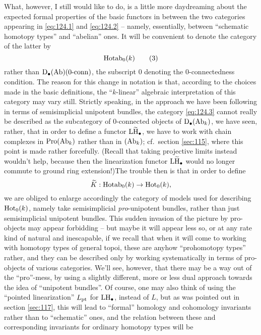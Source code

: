 What, however, I still would like to do, is a little more daydreaming
about the expected formal properties of the basic functors in between
the two categories appearing in \eqref{eq:124.1} and \eqref{eq:124.2}
-- namely, essentially, between ``schematic homotopy types'' and
``abelian'' ones. It will be convenient to denote the
category of the latter by
\begin{equation}
  \label{eq:124.3}
  \operatorname{Hotab}_0(k)\tag{3}
\end{equation}
rather than ${\mathrm{D}}_\bullet{\ensuremath{(\mathrm{Ab})}}(0\textup{-}\mathrm{conn})$, the subscript $0$ denoting the
$0$-connectedness condition. The reason for this change in notation is
that, according to the choices made in the basic definitions, the
``$k$-linear'' algebraic interpretation of this category may vary
still. Strictly speaking, in the approach we have been following in
terms of semisimplicial unipotent bundles, the category
\eqref{eq:124.3} cannot really be described as the subcategory of
$0$-connected objects of ${\mathrm{D}}_\bullet(\operatorname{Ab}_k)$, we have seen, rather,
that in order to define a functor $\operatorname{L\widetilde H}_\bullet$, we have to work with
chain complexes in $\operatorname{Pro}(\operatorname{Ab}_k)$ rather than in $(\operatorname{Ab}_k)$; cf.\
section \ref{sec:115}, where this point is made rather
forcefully. (Recall that taking projective limits instead wouldn't
help, because then the linearization functor $\operatorname{L\widetilde H}_\bullet$ would no
longer commute to ground ring extension!)\enspace The trouble then is
that in order to define
\[\widetilde K:\operatorname{Hotab}_0(k) \to \operatorname{Hot}_0(k),\]
we are obliged to enlarge accordingly the category of models used for
describing $\operatorname{Hot}_0(k)$, namely take semisimplicial
\emph{pro}-unipotent bundles, rather than just semisimplicial
unipotent bundles. This sudden invasion of the picture by pro-objects
may appear forbidding -- but maybe it will appear less so, or at any
rate kind of natural and inescapable, if we recall that when it will
come to working with homotopy types of general topoi, these are anyhow
``prohomotopy types'' rather, and they can be described only by
working systematically in terms of pro-objects of various
categories. We'll see, however, that there may be a way out of the
``pro''-mess, by using a slightly different, more or less dual
approach towards the idea of ``unipotent bundles''. Of course, one may
also think of using the ``pointed linearization'' $L_{\mathrm{pt}}$ for
$\operatorname{LH}_\bullet$, instead of $L$, but as was pointed out in section
\ref{sec:117}, this will lead to ``formal'' homology and cohomology
invariants rather than to ``schematic'' ones, and the relation between
these and corresponding invariants for ordinary homotopy types will be
